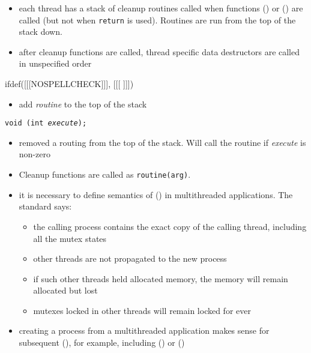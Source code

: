 \begin{slide}
\begin{itemize}
\item each thread has a stack of cleanup routines called when functions
() or () are called (but not when
\texttt{return} is used).  Routines are run from the top of the stack down.
\item after cleanup functions are called, thread specific data destructors are
called in unspecified order
\end{itemize}
ifdef([[[NOSPELLCHECK]]], [[[
]]])
\begin{itemize}
\item add \emph{routine} to the top of the stack
\end{itemize}
\texttt{void (int \emph{execute});}
\begin{itemize}
\item removed a routing from the top of the stack.  Will call the routine if
\emph{execute} is non-zero
\end{itemize}
\end{slide}

\label{PTHREAD_CLEANUP}

\begin{itemize}
\item Cleanup functions are called as \texttt{routine(arg)}.
\end{itemize}


\begin{slide}
\prgchars
\begin{itemize}
\item it is necessary to define semantics of () in multithreaded
applications.  The standard says:

\begin{itemize}
\item the calling process contains the exact copy of the calling thread,
including all the mutex states
\item other threads are not propagated to the new process
\item if such other threads held allocated memory, the memory will remain
allocated but lost
\item mutexes locked in other threads will remain locked for ever
\end{itemize}
\item creating a process from a multithreaded application makes sense for
subsequent (), for example,  including () or
()
\end{itemize}
\end{slide}

